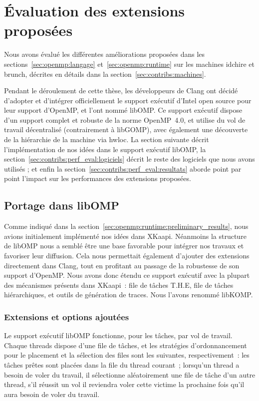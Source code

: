 \section{Évaluation des extensions proposées}\label{sec:contribs:perf_eval}


Nous avons évalué les différentes améliorations proposées dans les sections~\ref{sec:openmp:langage} et~\ref{sec:openmp:runtime} sur les machines idchire et brunch, décrites en détails dans la section~\ref{sec:contribs:machines}.

Pendant le déroulement de cette thèse, les développeurs de Clang ont décidé d'adopter et d'intégrer officiellement le support exécutif d'Intel open source pour leur support d'OpenMP, et l'ont nommé libOMP.
Ce support exécutif dispose d'un support complet et robuste de la norme OpenMP~4.0, et utilise du vol de travail décentralisé (contrairement à libGOMP), avec également une découverte de la hiérarchie de la machine via hwloc.
La section suivante décrit l'implémentation de nos idées dans le support exécutif libOMP, la section~\ref{sec:contribs:perf_eval:logiciels} décrit le reste des logiciels que nous avons utilisés ; et enfin la section~\ref{sec:contribs:perf_eval:resultats} aborde point par point l'impact sur les performances des extensions proposées.

\subsection{Portage dans libOMP}\label{sec:contribs:perf_eval:libkomp}

Comme indiqué dans la section~\ref{sec:openmp:runtime:preliminary_results}, nous avions initialement implémenté nos idées dans XKaapi.
Néanmoins la structure de libOMP nous a semblé être une base favorable pour intégrer nos travaux et favoriser leur diffusion.
Cela nous permettait également d'ajouter des extensions directement dans Clang, tout en profitant au passage de la robustesse de son support d'OpenMP.
Nous avons donc étendu ce support exécutif avec la plupart des mécanismes présents dans XKaapi~: file de tâches T.H.E, file de tâches hiérarchiques, et outils de génération de traces.
Nous l'avons renommé libKOMP.

\subsubsection{Extensions et options ajoutées}
\label{sec:contribs:perf_eval:portage_libkomp}

Le support exécutif libOMP fonctionne, pour les tâches, par vol de travail.
Chaque threads dispose d'une file de tâches, et les stratégies d'ordonnancement pour le placement et la sélection des files sont les suivantes, respectivement~: les tâches prêtes sont placées dans la file du thread courant~; lorsqu'un thread a besoin de voler du travail, il sélectionne aléatoirement une file de tâche d'un autre thread, s'il réussit un vol il reviendra voler cette victime la prochaine fois qu'il aura besoin de voler du travail.


